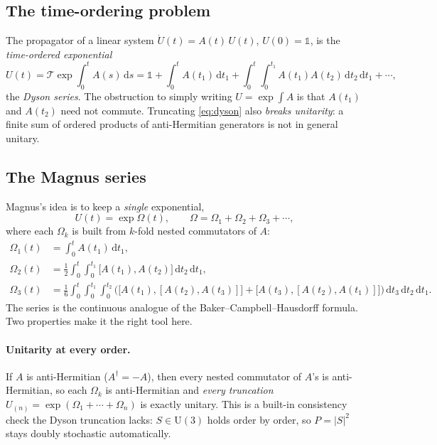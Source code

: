 \documentclass[11pt]{article}
\newcommand{\dd}{\mathrm{d}}
\newcommand{\Tord}{\mathcal{T}}
\newcommand{\U}{\mathrm{U}}
\begin{document}
\subsection{The time-ordering problem}
The propagator of a linear system $\dot U(t)=A(t)\,U(t)$, $U(0)=\mathbb 1$, is the \emph{time-ordered
exponential}
\begin{equation}
U(t)=\Tord\exp\!\int_0^t A(s)\,\dd s
=\mathbb 1+\int_0^t\! A(t_1)\,\dd t_1+\int_0^t\!\!\int_0^{t_1}\! A(t_1)A(t_2)\,\dd t_2\,\dd t_1+\cdots,
\label{eq:dyson}
\end{equation}
the \emph{Dyson series}. The obstruction to simply writing $U=\exp\!\int A$ is that $A(t_1)$ and $A(t_2)$
need not commute. Truncating \eqref{eq:dyson} also \emph{breaks unitarity}: a finite sum of ordered
products of anti-Hermitian generators is not in general unitary.

\subsection{The Magnus series}
Magnus's idea \cite{Magnus1954} is to keep a \emph{single} exponential,
\begin{equation}
U(t)=\exp\Omega(t),\qquad \Omega=\Omega_1+\Omega_2+\Omega_3+\cdots,
\end{equation}
where each $\Omega_k$ is built from $k$-fold nested commutators of $A$:
\begin{align}
\Omega_1(t)&=\int_0^t A(t_1)\,\dd t_1,\\
\Omega_2(t)&=\tfrac12\int_0^t\!\!\int_0^{t_1}\big[A(t_1),A(t_2)\big]\,\dd t_2\,\dd t_1,\\
\Omega_3(t)&=\tfrac16\int_0^t\!\!\int_0^{t_1}\!\!\int_0^{t_2}\Big(\big[A(t_1),[A(t_2),A(t_3)]\big]
+\big[A(t_3),[A(t_2),A(t_1)]\big]\Big)\,\dd t_3\,\dd t_2\,\dd t_1.
\end{align}
The series is the continuous analogue of the Baker--Campbell--Hausdorff formula. Two properties make it the
right tool here.

\paragraph{Unitarity at every order.} If $A$ is anti-Hermitian ($A^\dagger=-A$), then every nested
commutator of $A$'s is anti-Hermitian, so each $\Omega_k$ is anti-Hermitian and \emph{every truncation}
$U_{(n)}=\exp(\Omega_1+\cdots+\Omega_n)$ is exactly unitary. This is a built-in consistency check the Dyson
truncation lacks: $S\in\U(3)$ holds order by order, so $P=|S|^2$ stays doubly stochastic automatically.
\end{document}
